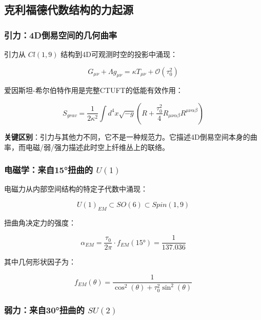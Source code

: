 \subsection{克利福德代数结构的力起源}

\subsubsection{引力：4D倒易空间的几何曲率}

引力从 $Cl(1,9)$ 结构到4D可观测时空的投影中涌现：

\begin{equation}
    G_{\mu\nu} + \Lambda g_{\mu\nu} = \kappa T_{\mu\nu} + \mathcal{O}(\tau_0^2)
\end{equation}

爱因斯坦-希尔伯特作用是完整CTUFT的低能有效作用：

\begin{equation}
    S_{grav} = \frac{1}{2\kappa^2} \int d^4x \sqrt{-g} \left(R + \frac{\tau_0^2}{4} R_{\mu\nu\alpha\beta} R^{\mu\nu\alpha\beta}\right)
\end{equation}

\textbf{关键区别}：引力与其他力不同，它不是一种规范力。它描述4D倒易空间本身的曲率，而电磁/弱/强力描述此时空上纤维丛上的联络。

\subsubsection{电磁学：来自15°扭曲的 $U(1)$}

电磁力从内部空间结构的特定子代数中涌现：

\begin{equation}
    U(1)_{EM} \subset SO(6) \subset Spin(1,9)
\end{equation}

扭曲角决定力的强度：

\begin{equation}
    \alpha_{EM} = \frac{\tau_0}{2\pi} \cdot f_{EM}(15°) = \frac{1}{137.036}
\end{equation}

其中几何形状因子为：

\begin{equation}
    f_{EM}(\theta) = \frac{1}{\cos^2(\theta) + \tau_0^2 \sin^2(\theta)}
\end{equation}

\subsubsection{弱力：来自30°扭曲的 $SU(2)$}

